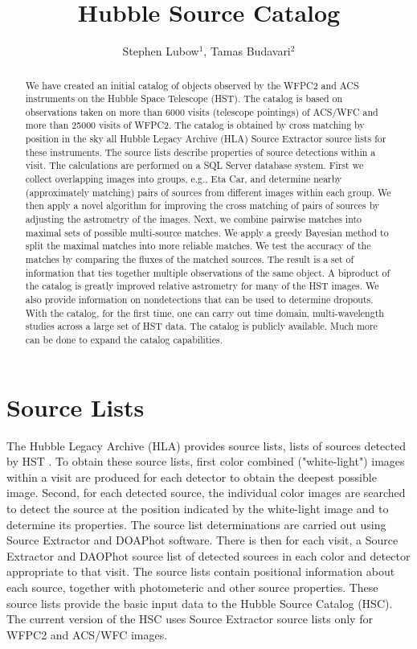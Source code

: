 \documentclass[11pt,twoside]{article}
\begin{document}
\title{Hubble Source Catalog}
\author{Stephen Lubow$^1$, Tamas Budavari$^2$
}

\begin{abstract}
We have created an initial catalog of objects observed by the WFPC2 and ACS instruments on the Hubble Space Telescope (HST). The catalog is based on observations taken on more than 6000 visits (telescope pointings) of ACS/WFC and more than 25000 visits of WFPC2. The catalog is obtained by cross matching by position in the sky all Hubble Legacy Archive (HLA) Source Extractor source lists for these instruments. The source lists describe properties of source detections within a visit. The calculations are performed on a SQL Server database system. First we collect overlapping images into groups, e.g., Eta Car, and determine nearby (approximately matching) pairs of sources from different images within each group. We then apply a novel algorithm for improving the cross matching of pairs of sources by adjusting the astrometry of the images. Next, we combine pairwise matches into maximal sets of possible multi-source matches. 
We apply a greedy Bayesian method to split the maximal matches into more reliable matches. We test the accuracy of the matches by comparing the fluxes of the matched sources. The result is a set of information that ties together multiple observations of the same object. A biproduct of the catalog is greatly improved relative astrometry for many of the HST images. We also provide information on nondetections that can be used to determine dropouts. With the catalog, for the first time, one can carry out time domain, multi-wavelength studies across a large set of HST data. The catalog is publicly available. Much more can be done to expand the catalog capabilities.

\end{abstract}

\section{Source Lists}

The Hubble Legacy Archive (HLA) provides source lists,
lists of sources detected by HST \cite{2008ASPC..394..481W}. To obtain these source lists,
first color combined ("white-light") images within a visit are produced for
each detector to obtain the deepest possible image.
Second, for each detected source, the individual color images 
are searched to detect the source at the position indicated by the white-light image
and to determine its properties.
The source list determinations are carried out using Source Extractor
and DOAPhot software. There is then for each visit, a Source Extractor and DAOPhot source list of detected
sources in each color and detector appropriate to that visit.
 The source lists contain positional information about each
source, together with photometeric and other source properties. 
These source lists provide the basic input data to the Hubble Source Catalog (HSC).
The current version of the HSC uses Source Extractor
source lists only for WFPC2 and ACS/WFC images.
\end{document}
